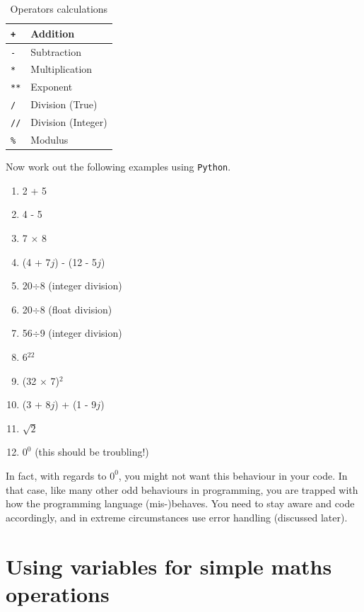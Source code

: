\begin{table}[H]
\begin{center}
\caption {Operators calculations}
\begin{tabular}{|l | p{3.5cm}|}
\hline
\texttt{+} & Addition\\\hline
\texttt{-} & Subtraction\\\hline
\texttt{*} & Multiplication\\\hline
\texttt{**} & Exponent\\\hline
\texttt{/} & Division (True)\\\hline
\texttt{//} & Division (Integer)\\\hline
\texttt{\%} & Modulus \\\hline
\end{tabular}
\end{center}
\end{table}

\noindent Now work out the following examples using \texttt{Python}.
\begin{enumerate}
\item 2 + 5
\item 4 - 5
\item 7 $\times$ 8
\item (4 + 7$j$) - (12 - 5$j$)
\item 20$\div$8 (integer division) 
\item 20$\div$8 (float division)
\item 56$\div$9 (integer division) 
\item 6$^{22}$
\item (32 $\times$ 7)$^{2}$
\item (3 + 8$j$) + (1 - 9$j$)
\item $\sqrt{2}$
\item $0^{0}$ (this should be troubling!)
\end{enumerate}

\begin{tcolorbox}[colback=red!5!white,colframe=red!75!black]

In fact, with regards to $0^0$, you might not want this behaviour in your code. In that case, like many other odd behaviours in programming, you are trapped with how the programming language (mis-)behaves. You need to stay aware and code accordingly, and in extreme circumstances use error handling (discussed later). 

\end{tcolorbox}

\section{Using variables for simple maths operations}


